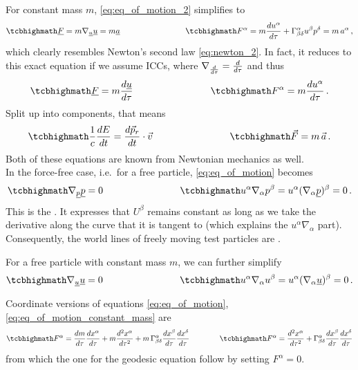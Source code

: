 \documentclass[../relativity_main.tex]{subfiles}
\begin{document}
For constant mass $m$, \eqref{eq:eq_of_motion_2} simplifies to
\begin{equation}\label{eq:eq_of_motion_constant_mass}
	\eqbox{
	\fvec{F} = m \nabla_{\fvec{u}} \fvec{u} = m \fvec{a}
	}
	\manyqquad
	\eqbox{
	F^\alpha = m \dv{u^\alpha}{\tau} + \Gamma^\alpha_{\beta \delta} u^\beta p^\delta = m \, a^\alpha
	} \, ,
\end{equation}
which clearly resembles Newton's second law \eqref{eq:newton_2}. In fact, it reduces to this exact equation if we assume ICCs, where $\nabla_{\dv{\tau}} = \dv{\tau}$ and thus
\begin{equation*}
	\eqbox{
	\fvec{F} = m \dv{\fvec{u}}{\tau}
	}
	\manyqquad
	\eqbox{
	F^\alpha = m \dv{u^\alpha}{\tau}
	} \, .
\end{equation*}
Split up into components, that means
\begin{equation}\label{eq:four_force_iccs_m_const}
	\eqbox{
	\frac{1}{c} \dv{E}{t} = \dv{\vec{p}_r}{t} \cdot \vec{v}
	}
	\manyqquad
	\eqbox{
	\vec{F} = m \, \vec{a}
	} \, .
\end{equation}
Both of these equations are known from Newtonian mechanics as well.\\



In the force-free case, i.e.~for a free particle, \eqref{eq:eq_of_motion} becomes
\begin{equation}\label{eq:geodesic_eq}
	\eqbox{
	\nabla_{\fvec{p}} \fvec{p} = 0
	}
	\manyqquad
	\eqbox{
	u^\alpha \nabla_\alpha p^\beta = u^\alpha (\nabla_\alpha \fvec{p})^\beta = 0
	} \, .
\end{equation}
This is the . It expresses that $U^\beta$ remains constant as long as we take the derivative along the curve that it is tangent to (which explains the $u^\alpha \nabla_\alpha$ part). Consequently, the world lines of freely moving test particles are .


For a free particle with constant mass $m$, we can further simplify
\begin{equation}\label{eq:geodesic_eq_simplified}
	\eqbox{
	\nabla_{\fvec{u}} \fvec{u} = 0
	}
	\manyqquad
	\eqbox{
	u^\alpha \nabla_\alpha u^\beta = u^\alpha (\nabla_\alpha \fvec{u})^\beta = 0
	} \, .
\end{equation}


Coordinate versions of equations \eqref{eq:eq_of_motion}, \eqref{eq:eq_of_motion_constant_mass} are
\begin{equation}\label{eq:geodesic_eq_coordinates}
	\eqbox{
	F^\alpha = \dv{m}{\tau} \dv{x^\alpha}{\tau} + m \dv[2]{x^\alpha}{\tau} + m \, \Gamma_{\beta \delta}^\alpha \dv{x^\beta}{\tau} \dv{x^\delta}{\tau}
	}
	\qquad \qquad
	\eqbox{
	F^\alpha = \dv[2]{x^\alpha}{\tau} + \Gamma_{\beta \delta}^\alpha \dv{x^\beta}{\tau} \dv{x^\delta}{\tau}
	}
\end{equation}
from which the one for the geodesic equation follow by setting $F^\alpha = 0$.
\end{document}
